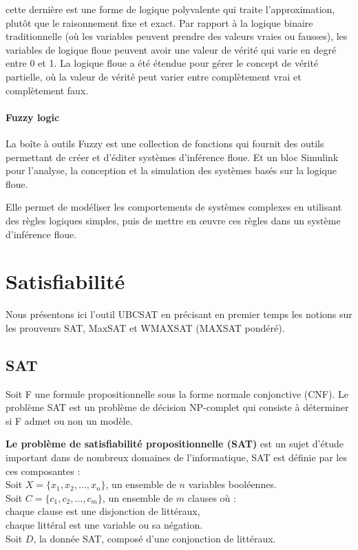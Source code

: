 cette dernière est une forme de logique polyvalente qui traite l’approximation, plutôt que le raisonnement fixe et exact. Par rapport à la logique binaire traditionnelle (où les variables peuvent prendre des valeurs vraies ou fausses), les variables de logique floue peuvent avoir une valeur de vérité qui varie en degré entre 0 et 1. La logique floue a été étendue pour gérer le concept de vérité partielle, où la valeur de vérité peut varier entre complètement vrai et complètement faux. 
\paragraph{Fuzzy logic} 
\vspace{1em}
La boîte à outils  Fuzzy est une collection de fonctions qui fournit des outils permettant de créer et d'éditer systèmes d'inférence floue. Et un bloc Simulink pour l'analyse, la conception et la simulation des systèmes basés sur la logique floue.

Elle permet de modéliser les comportements de systèmes complexes en utilisant des règles logiques simples, puis de mettre en œuvre ces règles dans un système d'inférence floue.

\section{Satisfiabilité}

Nous présentons ici l'outil UBCSAT en précisant en premier temps les notions sur les prouveurs SAT, MaxSAT et WMAXSAT (MAXSAT pondéré). 
\subsection{SAT}
Soit F une formule propositionnelle sous la forme normale conjonctive (CNF). Le problème SAT est un problème de décision NP-complet qui consiste à déterminer si F admet ou non un modèle\cite{hassenThesis}.

\textbf{Le problème de satisfiabilité propositionnelle (SAT)} est un sujet d'étude important dans de nombreux domaines de l'informatique, SAT est définie par les ces composantes :\\
\hspace{2em}Soit $X=\{x_1, x_2,\dots, x_n\}$, un ensemble de $n$ variables booléennes.\\
\hspace{2em}Soit $C=\{c_1, c_2,\dots, c_m\}$, un ensemble de $m$ clauses où :\\
\hspace{2em}chaque clause est une disjonction de littéraux,\\
\hspace{2em}chaque littéral est une variable ou sa négation.\\
\hspace{2em}Soit $D$, la donnée SAT, composé d'une conjonction de littéraux.

